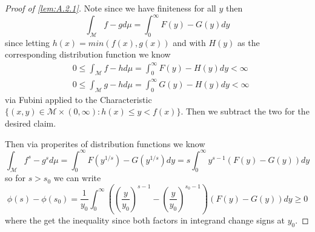 \documentclass[10pt]{article}
\newcommand{\1}{\textbf{1}}
\theoremstyle{remark}
\theoremstyle{definition}
\begin{document}
\begin{proof}[Proof of \ref{lem:A.2.1}]
	Note since we have finiteness for all $y$ then
	\begin{equation*}
		\int_{\mathcal{M}} f-gd\mu = \int_0^{\infty}F(y)-G(y)dy
	\end{equation*} since letting $h(x) = min(f(x),g(x))$ and with $H(y)$ as the corresponding distribution function we know
	\begin{align*}
		&0 \leq \int_{\mathcal{M}}f-hd\mu = \int_0^{\infty}F(y)-H(y)dy < \infty\\
		&0 \leq \int_{\mathcal{M}} g-hd\mu = \int_0^{\infty} G(y)-H(y)dy < \infty
	\end{align*} via Fubini applied to the Characteristic $\{(x,y) \in \mathcal{M} \times (0,\infty) : h(x) \leq y < f(x)\}$. Then we subtract the two for the desired claim.

	Then via properites of distribution functions we know
	\begin{equation*}
		\int_{\mathcal{M}}f^s -g^sd\mu = \int_0^{\infty}F(y^{1/s})-G(y^{1/s}) dy = s\int_0^{\infty}y^{s-1}(F(y)-G(y))dy
	\end{equation*} so for $s > s_0$ we can write
	\begin{equation*}
		\phi(s) - \phi(s_0) = \frac{1}{y_0} \int_0^{\infty}((\frac{y}{y_0})^{s-1}-(\frac{y}{y_0})^{s_0-1})(F(y)-G(y))dy \geq 0
	\end{equation*} where the get the inequality since both factors in integrand change signs at $y_0$.
\end{proof}
\end{document}
